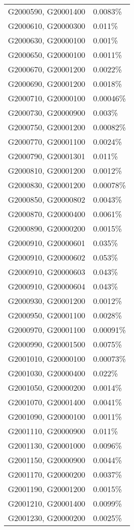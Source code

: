 \begin{longtable}[]{@{}ll@{}}
G2000590, G20001400 & 0.0083\% \\
G2000610, G20000300 & 0.011\% \\
G2000630, G20000100 & 0.001\% \\
G2000650, G20000100 & 0.0011\% \\
G2000670, G20001200 & 0.0022\% \\
G2000690, G20001200 & 0.0018\% \\
G2000710, G20000100 & 0.00046\% \\
G2000730, G20000900 & 0.003\% \\
G2000750, G20001200 & 0.00082\% \\
G2000770, G20001100 & 0.0024\% \\
G2000790, G20001301 & 0.011\% \\
G2000810, G20001200 & 0.0012\% \\
G2000830, G20001200 & 0.00078\% \\
G2000850, G20000802 & 0.0043\% \\
G2000870, G20000400 & 0.0061\% \\
G2000890, G20000200 & 0.0015\% \\
G2000910, G20000601 & 0.035\% \\
G2000910, G20000602 & 0.053\% \\
G2000910, G20000603 & 0.043\% \\
G2000910, G20000604 & 0.043\% \\
G2000930, G20001200 & 0.0012\% \\
G2000950, G20001100 & 0.0028\% \\
G2000970, G20001100 & 0.00091\% \\
G2000990, G20001500 & 0.0075\% \\
G2001010, G20000100 & 0.00073\% \\
G2001030, G20000400 & 0.022\% \\
G2001050, G20000200 & 0.0014\% \\
G2001070, G20001400 & 0.0041\% \\
G2001090, G20000100 & 0.0011\% \\
G2001110, G20000900 & 0.011\% \\
G2001130, G20001000 & 0.0096\% \\
G2001150, G20000900 & 0.0044\% \\
G2001170, G20000200 & 0.0037\% \\
G2001190, G20001200 & 0.0015\% \\
G2001210, G20001400 & 0.0099\% \\
G2001230, G20000200 & 0.0025\% \\

\end{longtable}

